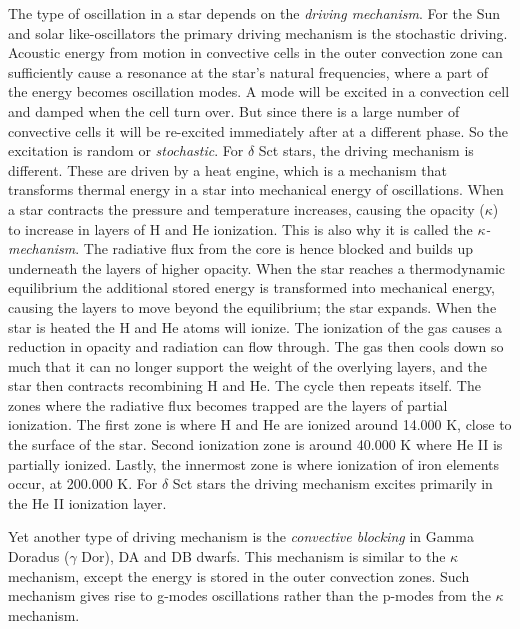 The type of oscillation in a star depends on the \textit{driving mechanism}. For the Sun and solar like-oscillators the primary driving mechanism is the stochastic driving. Acoustic energy from motion in convective cells in the outer convection zone can sufficiently cause a resonance at the star's natural frequencies, where a part of the energy becomes oscillation modes. A mode will be excited in a convection cell and damped when the cell turn over. But since there is a large number of convective cells it will be re-excited immediately after at a different phase. So the excitation is random or \textit{stochastic}. 
For $\delta$ Sct stars, the driving mechanism is different. These are driven by a heat engine, which is a mechanism that transforms thermal energy in a star into mechanical energy of oscillations. When a star contracts the pressure and temperature increases, causing the opacity ($\kappa$) to increase in layers of H and He ionization. This is also why it is called the \textit{$\kappa$-mechanism}. The radiative flux from the core is hence blocked and builds up underneath the layers of higher opacity. When the star reaches a thermodynamic equilibrium the additional stored energy is transformed into mechanical energy, causing the layers to move beyond the equilibrium; the star expands. When the star is heated the H and He atoms will ionize. The ionization of the gas causes a reduction in opacity and radiation can flow through. The gas then cools down so much that it can no longer support the weight of the overlying layers, and the star then contracts recombining H and He. The cycle then repeats itself. 
The zones where the radiative flux becomes trapped are the layers of partial ionization. The first zone is where H and He are ionized around 14.000 K, close to the surface of the star. Second ionization zone is around 40.000 K where He II is partially ionized. Lastly, the innermost zone is where ionization of iron elements occur, at 200.000 K. For $\delta$ Sct stars the driving mechanism excites primarily in the He II ionization layer.   

Yet another type of driving mechanism is the \textit{convective blocking} in Gamma Doradus ($\gamma$ Dor), DA and DB dwarfs. This mechanism is similar to the $\kappa$ mechanism, except the energy is stored in the outer convection zones. Such mechanism gives rise to g-modes oscillations rather than the p-modes from the $\kappa$ mechanism. 

